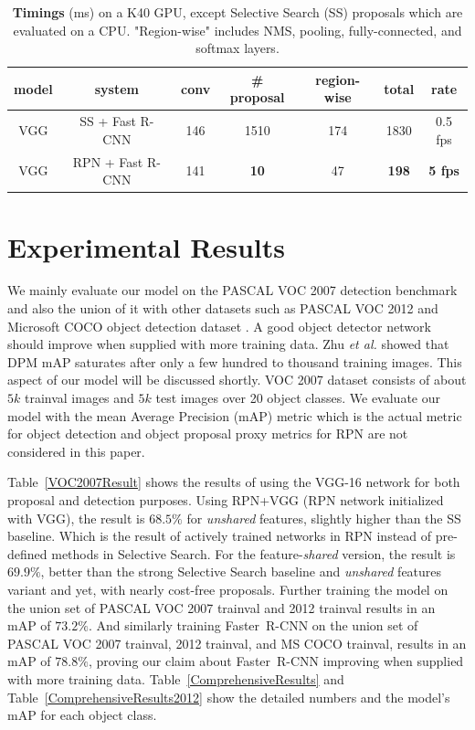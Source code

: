\documentclass[conference]{IEEEtran}
\newcommand{\faster}[0]{\mbox{Faster~R-CNN}}
\begin{document}
\begin{table}[t]
\caption{\small{\textbf{Timings} (ms) on a K40 GPU, except Selective Search (SS) proposals which are evaluated on a CPU. "Region-wise" includes NMS, pooling, fully-connected, and softmax layers.}}
\begin{minipage}{\linewidth}
\begin{center}
\renewcommand\footnoterule{ \kern -1ex}
\begin{tabular}{c|c|ccc|c|c}
model & system & conv &  \# proposal & region-wise & total & rate\\
\hline
\hline
VGG  & SS + Fast R-CNN &  146 &  1510 &  174 &  1830 &  0.5 fps\\
VGG &  RPN + Fast R-CNN &  141  & \textbf{10} &  47 &  \textbf{198}  & \textbf{5 fps}
\end{tabular}
\end{center}
\end{minipage}
\label{Timing}
\end{table}

\section{Experimental Results}
We mainly evaluate our model on the PASCAL VOC 2007 detection benchmark \cite{b11} and also the union of it with other datasets such as PASCAL VOC 2012 and Microsoft COCO object detection dataset \cite{b12}. A good object detector network should improve when supplied with more training data. Zhu \textit{et al.} \cite{a24} showed that DPM \cite{a8} mAP saturates after only a few hundred to thousand training images. This aspect of our model will be discussed shortly. VOC 2007 dataset consists of about $5k$ trainval images and $5k$ test images over 20 object classes. We evaluate our model with the mean Average Precision (mAP) metric which is the actual metric for object detection and object proposal proxy metrics for RPN are not considered in this paper.

Table~\ref{VOC2007Result} shows the results of using the VGG-16 network for both proposal and detection purposes. Using RPN+VGG (RPN network initialized with VGG), the result is $68.5\%$ for \textit{unshared} features, slightly higher than the SS baseline. Which is the result of actively trained networks in RPN instead of pre-defined methods in Selective Search. For the feature-\textit{shared} version, the result is $69.9\%$, better than the strong Selective Search baseline and \textit{unshared} features variant and yet, with nearly cost-free proposals.
Further training the model on the union set of PASCAL VOC 2007 trainval and 2012 trainval results in an mAP of $\mathbf{73.2\%}$. And similarly training \faster{} on the union set of PASCAL VOC 2007 trainval, 2012 trainval, and MS COCO trainval, results in an mAP of $\mathbf{78.8\%}$, proving our claim about \faster{} improving when supplied with more training data. Table~\ref{ComprehensiveResults} and Table~\ref{ComprehensiveResults2012} show the detailed numbers and the model's mAP for each object class.
\end{document}
